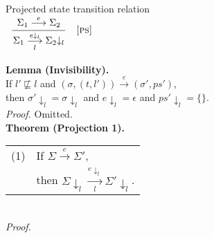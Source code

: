 \documentclass{article}
\makeatletter
\newcommand{\startrules}{\begin{array}{l@{~{,}~}lcl@{~{,}~}l|ll}}
\newcommand{\finishrules}{\end{array}}
\newcommand{\rn}[1]{\text{\textsc{[#1]}}}
\newcommand{\mrule}[3]{%
      \multicolumn{6}{c}{
        \dfrac{
          \begin{array}{c}
            #2
          \end{array}
        }{#3}
      }
    &
      \rn{#1}
  \\
      \multicolumn{7}{c}{}
  \\%
}
\newcommand{\tsteparrow}[1]{\overset{#1}{\longrightarrow}}
\newcommand{\tstep}[3]{#2\tsteparrow{#1}#3}
\newcommand{\ssteparrow}[1]{\overset{#1}{\longrightarrow}}
\newcommand{\sstep}[3]{#2\ssteparrow{#1}#3}
\newcommand{\lssteparrow}[2]{\overset{#2}{\underset{#1}{\longrightarrow}}}
\newcommand{\lsstep}[4]{#3\lssteparrow{#1}{#2}#4}
\newcommand{\process}[2]{(#1,#2)}
\newcommand{\proj}[2]{#1{\downarrow_{#2}}}
\makeatother
\begin{document}
\newpage
\noindent
%
%
\fbox{$\lsstep{l}{e}{\Sigma}{\Sigma}$} Projected state transition relation
\\
$\startrules
  \mrule{ps}{
      \sstep{e}{\Sigma_1}{\Sigma_2}
  }{
    \lsstep{l}{\proj{e}{l}}{\Sigma_1}{\proj{\Sigma_2}{l}}
  }
\finishrules$
\\
\textbf{Lemma (Invisibility).}
\\
If $l'\not\sqsubseteq l$
and $\tstep{e}{(\sigma,\process{t}{l'})}{(\sigma',ps')}$,
\\
then $\proj{\sigma'}{l}=\proj{\sigma}{l}$
and $\proj{e}{l}=\epsilon$
and $\proj{ps'}{l}=\{\}$.
\\
\textit{Proof.}
Omitted.
\\
\textbf{Theorem (Projection 1).}
\\
\begin{tabular}{l@{$\qquad$}l}
  (1) & If $\sstep{e}{\Sigma}{\Sigma'}$,
\\
      & then $\lsstep{l}{\proj{e}{l}}{\proj{\Sigma}{l}}{\proj{\Sigma'}{l}}$.
\end{tabular}
\\
\textit{Proof.}
\\
\newcommand{\z}{$\quad$}
\end{document}
